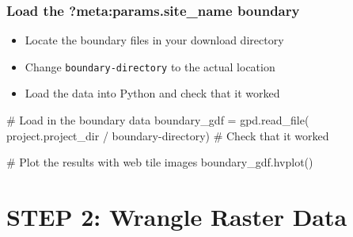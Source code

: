 \documentclass[
  letterpaper,
  DIV=11,
  numbers=noendperiod,
  oneside]{scrreprt}
\newenvironment{Shaded}{\begin{snugshade}}{\end{snugshade}}
\newcommand{\CommentTok}[1]{\textcolor[rgb]{0.37,0.37,0.37}{#1}}
\newcommand{\NormalTok}[1]{\textcolor[rgb]{0.00,0.23,0.31}{#1}}
\newcommand{\OperatorTok}[1]{\textcolor[rgb]{0.37,0.37,0.37}{#1}}
\newcommand{\StringTok}[1]{\textcolor[rgb]{0.13,0.47,0.30}{#1}}
\providecommand{\tightlist}{%
  \setlength{\itemsep}{0pt}\setlength{\parskip}{0pt}}
\begin{document}
\subsection{\texorpdfstring{Load the \textbf{?meta:params.site\_name}
boundary}{Load the ?meta:params.site\_name boundary}}\label{load-the-boundary-1}

\begin{tcolorbox}[enhanced jigsaw, colbacktitle=quarto-callout-color!10!white, opacityback=0, bottomtitle=1mm, toptitle=1mm, bottomrule=.15mm, left=2mm, colframe=quarto-callout-color-frame, leftrule=.75mm, opacitybacktitle=0.6, colback=white, rightrule=.15mm, toprule=.15mm, breakable, titlerule=0mm, title=\textcolor{quarto-callout-color}{\faInfo}\hspace{0.5em}{Try It}, coltitle=black, arc=.35mm]

\begin{itemize}
\tightlist
\item
  Locate the boundary files in your download directory
\item
  Change \texttt{\textquotesingle{}boundary-directory\textquotesingle{}}
  to the actual location
\item
  Load the data into Python and check that it worked
\end{itemize}

\end{tcolorbox}

\begin{Shaded}
\begin{Highlighting}[]
\CommentTok{\# Load in the boundary data}
\NormalTok{boundary\_gdf }\OperatorTok{=}\NormalTok{ gpd.read\_file(}
\NormalTok{    project.project\_dir }\OperatorTok{/} \StringTok{\textquotesingle{}boundary{-}directory\textquotesingle{}}\NormalTok{)}
\CommentTok{\# Check that it worked}
\end{Highlighting}
\end{Shaded}

\begin{Shaded}
\begin{Highlighting}[]
\CommentTok{\# Plot the results with web tile images}
\NormalTok{boundary\_gdf.hvplot()}
\end{Highlighting}
\end{Shaded}


\chapter{STEP 2: Wrangle Raster
Data}\label{step-2-wrangle-raster-data-1}
\end{document}
